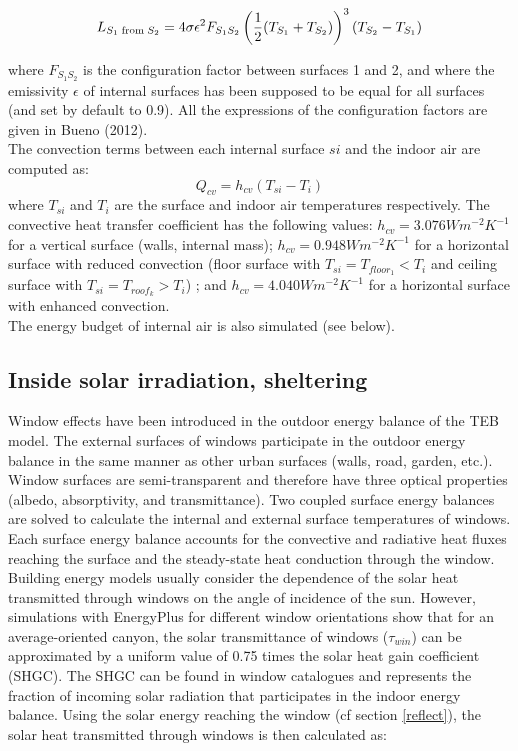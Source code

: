 \begin{equation}
L_{S_1\; {\rm from} \; S_2} = 4 \sigma \epsilon^2 F_{S_1S_2}\left(\frac{1}{2}(T_{S_1}+T_{S_2})\right)^3 \left(T_{S_2}-T_{S_1}\right)
\end{equation}

where $F_{S_1S_2}$ is the configuration factor between surfaces 1 and 2, and where the emissivity $\epsilon$ of internal surfaces has been supposed to be equal for all surfaces (and set by default to 0.9). All the expressions of the configuration factors are given in Bueno \etal (2012)\nocite{bueno2012}. \\

The convection terms between each internal surface $si$ and the indoor air are computed as:
\begin{equation}
Q_{cv} = h_{cv}(T_{si}-T_i)
\end{equation}
where $T_{si}$ and $T_i$ are the surface and indoor air temperatures respectively. The  convective   heat   transfer   coefficient   has   the   following   values: $h_{cv}= 3.076 Wm^{-2}K^{-1}$ for  a  vertical  surface (walls, internal mass); $h_{cv}= 0.948 Wm^{-2}K^{-1}$ for a horizontal surface with reduced convection (floor surface with $T_{si}=T_{floor_1}<T_i$ and ceiling surface with $T_{si}=T_{roof_k}>T_i$) ; and $h_{cv}= 4.040 Wm^{-2}K^{-1}$ for a horizontal surface with enhanced convection. \\


The energy budget of internal air is also simulated (see below).\\


\subsection{Inside solar irradiation, sheltering}


Window effects have been introduced in the outdoor energy balance of the TEB model. The external surfaces of windows participate in the outdoor energy balance in the same manner as other urban surfaces (walls, road, garden, etc.).  Window surfaces are semi-transparent and therefore have three optical properties (albedo, absorptivity, and transmittance). Two coupled surface energy balances are solved to calculate the internal and external surface temperatures of windows. Each surface energy balance accounts for the convective and radiative heat fluxes reaching the surface and the steady-state heat conduction through the window.
Building energy models usually consider the dependence of the solar heat transmitted through windows on the angle of incidence of the sun. However, simulations with EnergyPlus for different window orientations show that for an average-oriented canyon, the solar transmittance of windows ($\tau_{win}$) can be approximated by a uniform value of 0.75 times the solar heat gain coefficient (SHGC). The SHGC can be found in window catalogues and represents the fraction of incoming solar radiation that participates in the indoor energy balance. Using the solar energy reaching the window (cf section \ref{reflect}), the solar heat transmitted through windows is then calculated as:

